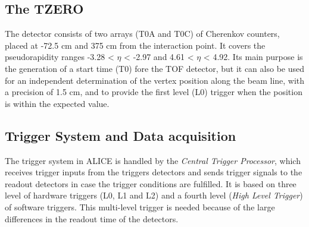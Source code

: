 \subsection*{The TZERO}
The detector consists of two arrays (T0A and T0C) of Cherenkov counters, placed at -72.5 cm and 375 cm from the interaction point. It covers the pseudorapidity ranges -3.28 < $\eta$ < -2.97 and 4.61 < $\eta$ < 4.92. Its main purpose is the generation of a start time (T0) fore the TOF detector, but it can also be used for an independent determination of the vertex position along the beam line, with a precision of 1.5 cm, and to provide the first level (L0) trigger when the position is within the expected value.
\subsection{Trigger System and Data acquisition}
The trigger system in ALICE is handled by the \textit{Central Trigger Processor}, which receives trigger inputs from the triggers detectors and sends trigger signals to the readout detectors in case the trigger conditions are fulfilled. It is based on three level of hardware triggers (L0, L1 and L2) and a fourth level (\textit{High Level Trigger}) of software triggers. This multi-level trigger is needed because of the large differences in the readout time of the detectors.\\
